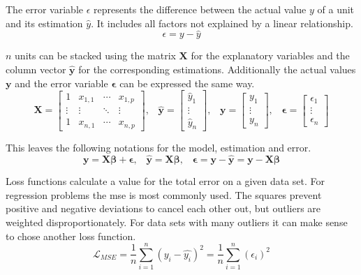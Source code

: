 The error variable $\epsilon$ represents the difference between the actual value $y$ of a unit and its estimation $\hat{y}$. It includes all factors not explained by a linear relationship. 
\begin{equation}
    \epsilon = y - \hat{y}
\end{equation}

$n$ units can be stacked using the matrix $\mathbf{X}$ for the explanatory variables and the column vector $\mathbf{\hat{y}}$ for the corresponding estimations. Additionally the actual values $\mathbf{y}$ and the error variable $\boldsymbol{\epsilon}$ can be expressed the same way.
\begin{equation}
    \mathbf{X} = \begin{bmatrix}1&x_{1,1}&\cdots &x_{1,p}\\\vdots&\vdots&\ddots&\vdots\\1&x_{n,1}&\cdots &x_{n,p}\end{bmatrix}\text{,}\quad
    \mathbf{\hat{y}} = \begin{bmatrix}\hat{y}_1\\\vdots\\\hat{y}_n\end{bmatrix}\text{,}\quad
    \mathbf{y} = \begin{bmatrix}y_1\\\vdots\\y_n\end{bmatrix}\text{,}\quad
    \boldsymbol{\epsilon} = \begin{bmatrix}\epsilon_1\\\vdots\\\epsilon_n\end{bmatrix}
\end{equation}

This leaves the following notations for the model, estimation and error.
\begin{equation}
    \mathbf{y} = \mathbf{X}\boldsymbol{\beta} + \boldsymbol{\epsilon}\text{,}\quad
    \mathbf{\hat{y}} = \mathbf{X}\boldsymbol{\beta}\text{,}\quad
    \boldsymbol{\epsilon} = \mathbf{y} - \mathbf{\hat{y}} = \mathbf{y} - \mathbf{X}\boldsymbol{\beta}
\end{equation}

Loss functions calculate a value for the total error on a given data set. For regression problems the \gls{mse} is most commonly used. The squares prevent positive and negative deviations to cancel each other out, but outliers are weighted disproportionately. For data sets with many outliers it can make sense to chose another loss function. 
\begin{equation}
    \mathcal{L}_{MSE} = \frac{1}{n}\sum_{i=1}^{n} {(y_i - \hat{y_i})}^2 = \frac{1}{n}\sum_{i=1}^{n} {(\epsilon_i)}^2
\end{equation}

